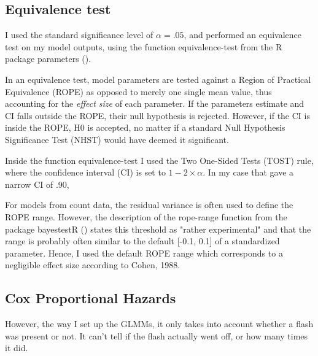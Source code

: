 \subsection{Equivalence test}
I used the standard significance level of $\alpha = .05$, and performed an equivalence test on my model outputs, using the function equivalence-test from the R package parameters ().%

In an equivalence test, model parameters are tested against a Region of Practical Equivalence (ROPE) as opposed to merely one single mean value, thus accounting for the \emph{effect size} of each parameter.
If the parameters estimate and CI falls outside the ROPE, their null hypothesis is rejected. However, if the CI is inside the ROPE, H0 is accepted, no matter if a standard Null Hypothesis Significance Test (NHST) would have deemed it significant.

Inside the function equivalence-test I used the Two One-Sided Tests (TOST) rule, where the confidence interval (CI) is set to $1 - 2\times \alpha$. In my case that gave a narrow CI of .90,

For models from count data, the residual variance is often used to define the ROPE range. However, the description of the rope-range function from the package bayestestR () states this threshold as "rather experimental" and that the range is probably often similar to the default [-0.1, 0.1] of a standardized parameter.
Hence, I used the default ROPE range which corresponds to a negligible effect size according to Cohen, 1988.









	\subsection*{Cox Proportional Hazards}


However, the way I set up the GLMMs, it only takes into account whether a flash was present or not. It can't tell if the flash actually went off, or how many times it did.


